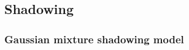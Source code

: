 \documentclass[lettersize,journal]{IEEEtran}
\newtheorem*{remark}{Remark}
\begin{document}

  
  \subsection{Shadowing}




\subsubsection{Gaussian mixture shadowing model}
\label{sec:guassianmixture}
\end{document}
